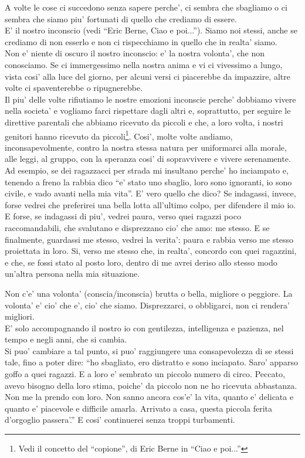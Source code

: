 A volte le cose ci succedono senza sapere perche', ci sembra che sbagliamo o ci sembra che siamo piu' fortunati di quello che crediamo di essere.\\ 
E' il nostro inconscio (vedi ``Eric Berne, Ciao e poi...''). Siamo noi stessi, anche se crediamo di non esserlo e non ci rispecchiamo in quello che in realta' siamo.\\
Non e' niente di oscuro il nostro inconscio: e' la nostra volonta', che non conosciamo. Se ci immergessimo nella nostra anima e vi ci vivessimo a lungo, vista cosi' alla luce del giorno, per alcuni versi ci piacerebbe da impazzire, altre volte ci spaventerebbe o ripugnerebbe.\\
Il piu' delle volte rifiutiamo le nostre emozioni inconscie perche' dobbiamo vivere nella societa' e vogliamo farci rispettare dagli altri e, soprattutto, per seguire le direttive parentali che abbiamo ricevuto da piccoli e che, a loro volta, i nostri genitori hanno ricevuto da piccoli\footnote{Vedi il concetto del ``copione'', di Eric Berne in ``Ciao e poi...''}. Cosi', molte volte andiamo, inconsapevolmente, contro la nostra stessa natura per uniformarci alla morale, alle leggi, al gruppo, con la speranza cosi' di sopravvivere e vivere serenamente.\\
Ad esempio, se dei ragazzacci per strada mi insultano perche' ho inciampato e, tenendo a freno la rabbia dico ``e' stato uno sbaglio, loro sono ignoranti, io sono civile, e vado avanti nella mia vita''. E' vero quello che dico? Se indagassi, invece, forse vedrei che preferirei una bella lotta all'ultimo colpo, per difendere il mio io. E forse, se indagassi di piu', vedrei paura, verso quei ragazzi poco raccomandabili, che svalutano e disprezzano cio' che amo: me stesso. E se finalmente, guardassi me stesso, vedrei la verita': paura e rabbia verso me stesso proiettata in loro. Si, verso me stesso che, in realta', concordo con quei ragazzini, e che, se fossi stato al posto loro, dentro di me avrei deriso allo stesso modo un'altra persona nella mia situazione.

Non c'e' una volonta' (conscia/inconscia) brutta o bella, migliore o peggiore. La volonta' e' cio' che e', cio' che siamo. Disprezzarci, o obbligarci, non ci rendera' migliori.\\
E' solo accompagnando il nostro io con gentilezza, intelligenza e pazienza, nel tempo e negli anni, che si cambia.\\
Si puo' cambiare a tal punto, si puo' raggiungere una consapevolezza di se stessi tale, fino a poter dire: ``ho sbagliato, ero distratto e sono inciapato. Saro' apparso goffo a quei ragazzi. E a loro e' sembrato un piccolo numero di circo. Peccato, avevo bisogno della loro stima, poiche' da piccolo non ne ho ricevuta abbastanza. Non me la prendo con loro. Non sanno ancora cos'e' la vita, quanto e' delicata e quanto e' piacevole e difficile amarla. Arrivato a casa, questa piccola ferita d'orgoglio passera'.'' E cosi' continuerei senza troppi turbamenti.\\


